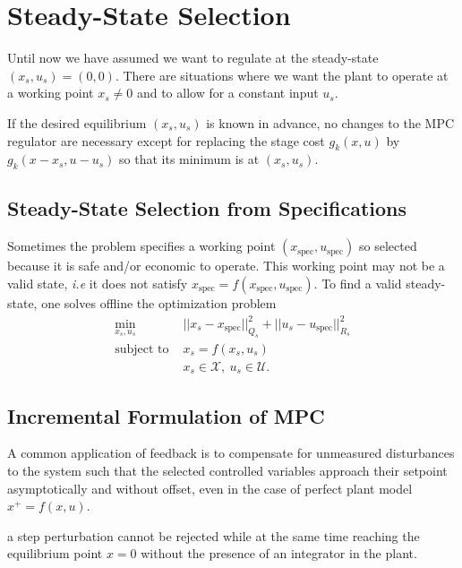 \section{Steady-State Selection}
\label{sec:steady-state-selection}

Until now we have assumed we want to regulate at the steady-state $(x_s,u_s) = (0,0)$. There are situations where we want the plant to operate at a working point $x_s\neq 0$ and to allow for a constant input $u_s$.

If the desired equilibrium $(x_s, u_s)$ is known in advance, no changes to the MPC regulator are necessary except for replacing the stage cost $g_k(x,u)$ by $g_k(x-x_s,u-u_s)$ so that its minimum is at $(x_s,u_s)$.

\subsection{Steady-State Selection from Specifications}
\label{sec:steady-state-from-specs}

Sometimes the problem specifies a working point $(x_\text{spec},u_\text{spec})$ so selected because it is safe and/or economic to operate. This working point may not be a valid state, \textit{i.e} it does not satisfy $x_\text{spec} = f(x_\text{spec},u_\text{spec})$. To find a valid steady-state, one solves offline the optimization problem
\begin{align*}
  \min_{x_s,u_s} & ||x_s-x_\text{spec}||_{Q_s}^2 + ||u_s-u_\text{spec}||_{R_s}^2 \\
  \text{subject to } & x_s = f(x_s,u_s) \\
                 & x_s \in \mathcal{X},\ u_s \in \mathcal{U}.
\end{align*}


\subsection{Incremental Formulation of MPC}
\label{sec:incremental-formulation-MPC}

A common application of feedback is to compensate for unmeasured disturbances to the system such that the selected controlled variables approach their setpoint asymptotically and without offset, even in the case of perfect plant model $x^+ = f(x,u)$. 


a step perturbation cannot be rejected while at the same time reaching the equilibrium point $x=0$ without the presence of an integrator in the plant.


